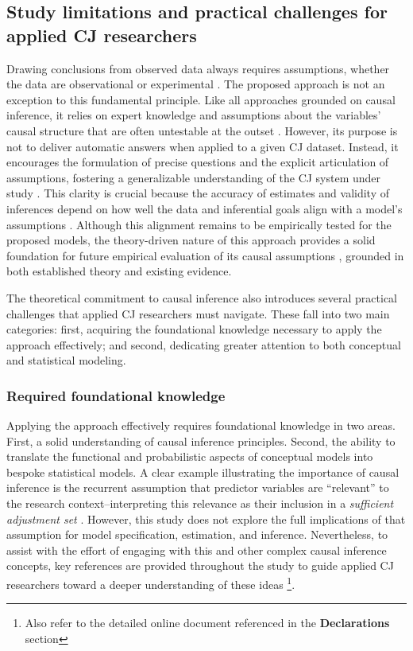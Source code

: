 \documentclass[
  authoryear,
  review,
  1p]{elsarticle}
\begin{document}
\subsection{Study limitations and practical challenges for applied CJ
researchers}\label{sec-discussion_challenges}

Drawing conclusions from observed data always requires assumptions,
whether the data are observational or experimental
\citep{Kohler_et_al_2019, Deffner_et_al_2022}. The proposed approach is
not an exception to this fundamental principle. Like all approaches
grounded on causal inference, it relies on expert knowledge and
assumptions about the variables' causal structure that are often
untestable at the outset \citep{Hernan_et_al_2025}. However, its purpose
is not to deliver automatic answers when applied to a given CJ dataset.
Instead, it encourages the formulation of precise questions and the
explicit articulation of assumptions, fostering a generalizable
understanding of the CJ system under study
\citep{Rohrer_et_al_2022, Deffner_et_al_2022, Sterner_et_al_2024}. This
clarity is crucial because the accuracy of estimates and validity of
inferences depend on how well the data and inferential goals align with
a model's assumptions \citep{Kohler_et_al_2019}. Although this alignment
remains to be empirically tested for the proposed models, the
theory-driven nature of this approach provides a solid foundation for
future empirical evaluation of its causal assumptions
\citep{Deffner_et_al_2022}, grounded in both established theory and
existing evidence.

The theoretical commitment to causal inference also introduces several
practical challenges that applied CJ researchers must navigate. These
fall into two main categories: first, acquiring the foundational
knowledge necessary to apply the approach effectively; and second,
dedicating greater attention to both conceptual and statistical
modeling.

\subsubsection{Required foundational
knowledge}\label{sec-discussion_challenges1}

Applying the approach effectively requires foundational knowledge in two
areas. First, a solid understanding of causal inference principles.
Second, the ability to translate the functional and probabilistic
aspects of conceptual models into bespoke statistical models. A clear
example illustrating the importance of causal inference is the recurrent
assumption that predictor variables are ``relevant'' to the research
context--interpreting this relevance as their inclusion in a
\emph{sufficient adjustment set}
\citep{Pearl_2009, Pearl_et_al_2016, Morgan_et_al_2014}. However, this
study does not explore the full implications of that assumption for
model specification, estimation, and inference. Nevertheless, to assist
with the effort of engaging with this and other complex causal inference
concepts, key references are provided throughout the study to guide
applied CJ researchers toward a deeper understanding of these ideas
\footnote{Also refer to the detailed online document referenced in the
  \textbf{Declarations} section}.
\end{document}

